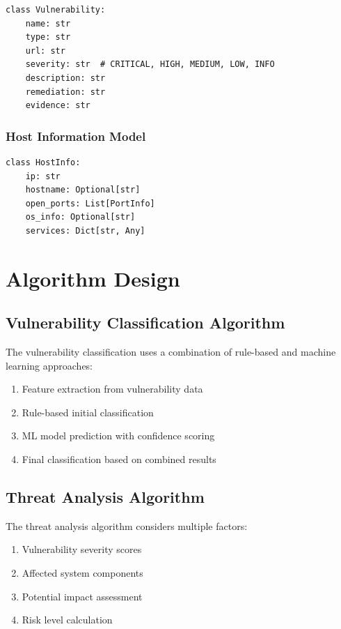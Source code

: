 \documentclass[12pt,a4paper]{report}
\begin{document}
\begin{lstlisting}[caption=Vulnerability Data Model]
class Vulnerability:
    name: str
    type: str
    url: str
    severity: str  # CRITICAL, HIGH, MEDIUM, LOW, INFO
    description: str
    remediation: str
    evidence: str
\end{lstlisting}

\subsubsection{Host Information Model}

\begin{lstlisting}[caption=Host Information Data Model]
class HostInfo:
    ip: str
    hostname: Optional[str]
    open_ports: List[PortInfo]
    os_info: Optional[str]
    services: Dict[str, Any]
\end{lstlisting}

\section{Algorithm Design}

\subsection{Vulnerability Classification Algorithm}

The vulnerability classification uses a combination of rule-based and machine learning approaches:

\begin{enumerate}
    \item Feature extraction from vulnerability data
    \item Rule-based initial classification
    \item ML model prediction with confidence scoring
    \item Final classification based on combined results
\end{enumerate}

\subsection{Threat Analysis Algorithm}

The threat analysis algorithm considers multiple factors:

\begin{enumerate}
    \item Vulnerability severity scores
    \item Affected system components
    \item Potential impact assessment
    \item Risk level calculation
\end{enumerate}
\end{document}
